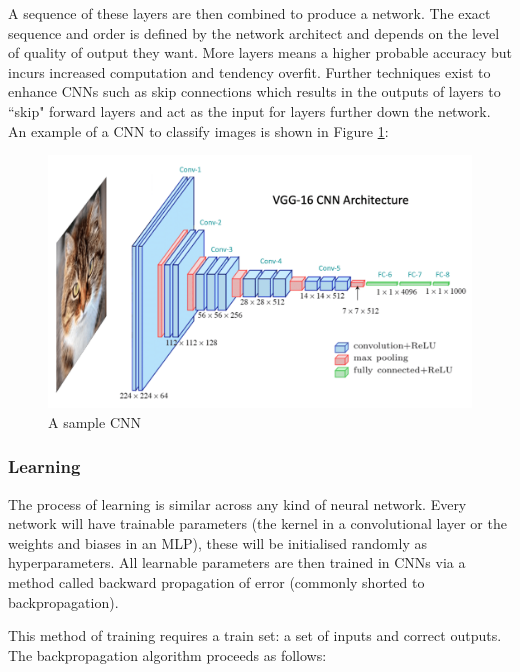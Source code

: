 A sequence of these layers are then combined to produce a network. The exact sequence and order is defined by the network architect and depends on the level of quality of output they want. More layers means a higher probable accuracy but incurs increased computation and tendency overfit. Further techniques exist to enhance CNNs such as skip connections which results in the outputs of layers to ``skip" forward layers and act as the input for layers further down the network. An example of a CNN to classify images is shown in Figure \ref{fig:sample-cnn}:

\begin{figure}[h]
    \centering
    \includegraphics[width=0.5\linewidth]{dissertation//figures/sample-cnn.png}
    \caption{A sample CNN\cite{kromydas2023convolutional}}
    \label{fig:sample-cnn}
\end{figure}

\subsubsection{Learning}

The process of learning is similar across any kind of neural network. Every network will have trainable parameters (the kernel in a convolutional layer or the weights and biases in an MLP), these will be initialised randomly as hyperparameters. All learnable parameters are then trained in CNNs via a method called backward propagation of error (commonly shorted to backpropagation)\cite{rojas2013neural}.

This method of training requires a train set: a set of inputs and correct outputs. The backpropagation algorithm proceeds as follows:

